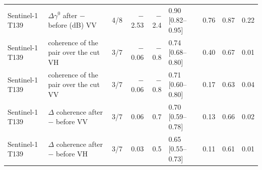 \begin{table}[htbp]
\begin{tabular}{llcrrlrrr}
Sentinel-1 T139 & $\Delta\gamma^0$ after $-$ before (dB) VV & 4/8 & $-$2.53 & $-$2.4 & 0.90 [0.82--0.95] & 0.76 & 0.87 & 0.22 \\
Sentinel-1 T139 & coherence of the pair over the cut VH & 3/7 & $-$0.06 & $-$0.8 & 0.74 [0.68--0.80] & 0.40 & 0.67 & 0.01 \\
Sentinel-1 T139 & coherence of the pair over the cut VV & 3/7 & $-$0.06 & $-$0.8 & 0.71 [0.60--0.80] & 0.17 & 0.63 & 0.04 \\
Sentinel-1 T139 & $\Delta$ coherence after $-$ before VV & 3/7 & 0.06 & 0.7 & 0.70 [0.59--0.78] & 0.13 & 0.66 & 0.02 \\
Sentinel-1 T139 & $\Delta$ coherence after $-$ before VH & 3/7 & 0.03 & 0.5 & 0.65 [0.55--0.73] & 0.11 & 0.61 & 0.01 \\
\bottomrule
\end{tabular}
\end{table}
